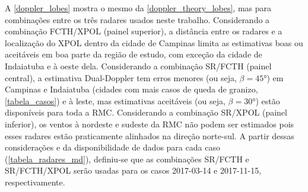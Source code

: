 A \autoref{doppler_lobes} mostra o mesmo da \autoref{doppler_theory_lobes}, mas para combinações entre os três radares usados neste trabalho. Considerando a combinação FCTH/XPOL (painel superior), a distância entre os radares e a localização do XPOL dentro da cidade de Campinas limita as estimativas boas ou aceitáveis em boa parte da região de estudo, com exceção da cidade de Indaiatuba e à oeste dela. Considerando a combinação SR/FCTH (painel central), a estimativa Dual-Doppler tem erros menores (ou seja, $\beta=\ang{45}$) em Campinas e Indaiatuba (cidades com mais casos de queda de granizo, \autoref{tabela_casos}) e à leste, mas estimativas aceitáveis (ou seja, $\beta=\ang{30}$) estão disponíveis para toda a RMC. Considerando a combinação SR/XPOL (painel inferior), os ventos à nordeste e sudeste da RMC não podem ser estimados pois esses radares estão praticamente alinhados na direção norte-sul. A partir dessas considerações e da disponibilidade de dados para cada caso (\autoref{tabela_radares_md}), definiu-se que as combinações SR/FCTH e SR/FCTH/XPOL serão usadas para os casos 2017-03-14 e 2017-11-15, respectivamente.

